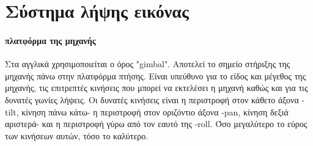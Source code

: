 \documentclass[a4paper, 12pt, twoside]{report}
\begin{document}
{{{{{{			
		\section{Σύστημα λήψης εικόνας}
			\paragraph{πλατφόρμα της μηχανής}{Στα αγγλικά χρησιμοποιείται ο όρος "gimbal". Αποτελεί το σημείο στήριξης της μηχανής πάνω στην πλατφόρμα πτήσης. Είναι υπεύθυνο για το είδος και μέγεθος της μηχανής, τις επιτρεπτές κινήσεις που μπορεί να εκτελέσει η μηχανή καθώς και για τις δυνατές γωνίες λήψεις. Οι δυνατές κινήσεις είναι η περιστροφή στον κάθετο άξονα -tilt, κίνηση πάνω κάτω- η περιστροφή στον οριζόντιο άξονα -pan, κίνηση δεξιά αριστερά- και η περιστροφή γύρω από τον εαυτό της -roll. Όσο μεγαλύτερο το εύρος των κινήσεων αυτών, τόσο το καλύτερο.
			}
			
			\begin{landscape}	
			\setlength\LTleft{0pt}            %
			\setlength\LTright{0pt}           %
	

\end{landscape}}}}}}}
\end{document}

